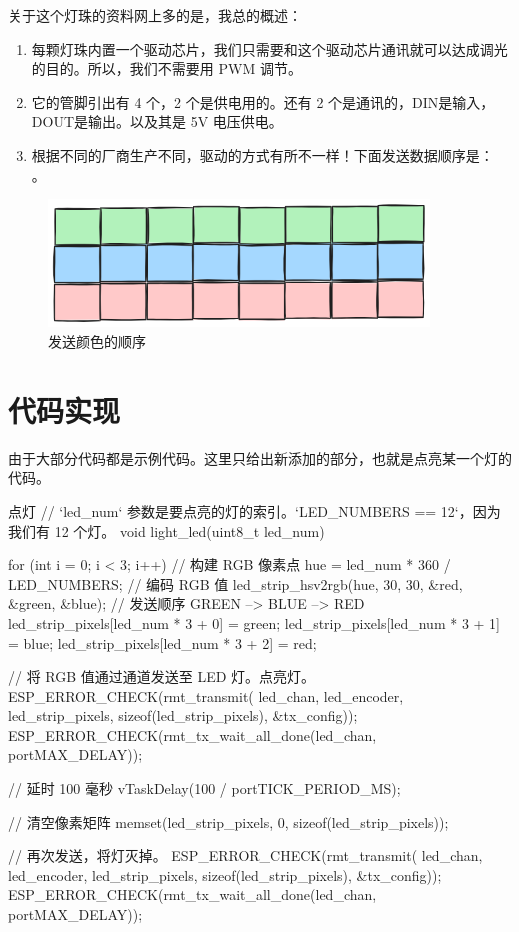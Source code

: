 \documentclass[lang=cn,newtx,10pt,scheme=chinese]{elegantbook}
\begin{document}
关于这个灯珠的资料网上多的是，我总的概述：

\begin{enumerate}
\item 每颗灯珠内置一个驱动芯片，我们只需要和这个驱动芯片通讯就可以达成调光的目的。所以，我们不需要用 PWM 调节。
\item 它的管脚引出有 4 个，2 个是供电用的。还有 2 个是通讯的，DIN是输入，DOUT是输出。以及其是 5V 电压供电。
\item 根据不同的厂商生产不同，驱动的方式有所不一样！下面发送数据顺序是： 。
\end{enumerate}

\begin{figure}[!htb]
\centering
\includegraphics[width=0.9\textwidth]{rmt-rgb.png}
\caption{发送颜色的顺序}
\end{figure}

\section{代码实现}

由于大部分代码都是示例代码。这里只给出新添加的部分，也就是点亮某一个灯的代码。

\begin{mycode}{点灯}
// `led_num` 参数是要点亮的灯的索引。`LED_NUMBERS == 12`，因为我们有 12 个灯。
void light_led(uint8_t led_num)
{
    for (int i = 0; i < 3; i++)
    {
        // 构建 RGB 像素点
        hue = led_num * 360 / LED_NUMBERS;
        // 编码 RGB 值
        led_strip_hsv2rgb(hue, 30, 30, &red, &green, &blue);
        // 发送顺序 GREEN --> BLUE --> RED
        led_strip_pixels[led_num * 3 + 0] = green;
        led_strip_pixels[led_num * 3 + 1] = blue;
        led_strip_pixels[led_num * 3 + 2] = red;
    }

    // 将 RGB 值通过通道发送至 LED 灯。点亮灯。
    ESP_ERROR_CHECK(rmt_transmit(
        led_chan,
        led_encoder,
        led_strip_pixels,
        sizeof(led_strip_pixels),
        &tx_config));
    ESP_ERROR_CHECK(rmt_tx_wait_all_done(led_chan, portMAX_DELAY));

    // 延时 100 毫秒
    vTaskDelay(100 / portTICK_PERIOD_MS);

    // 清空像素矩阵
    memset(led_strip_pixels, 0, sizeof(led_strip_pixels));

    // 再次发送，将灯灭掉。
    ESP_ERROR_CHECK(rmt_transmit(
        led_chan,
        led_encoder,
        led_strip_pixels,
        sizeof(led_strip_pixels),
        &tx_config));
    ESP_ERROR_CHECK(rmt_tx_wait_all_done(led_chan, portMAX_DELAY));
}
\end{mycode}
\end{document}
